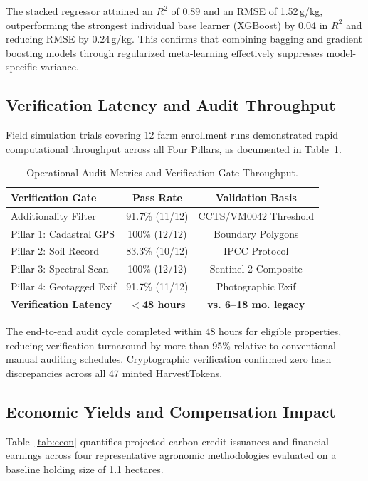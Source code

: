 \documentclass[10pt,a4paper,twocolumn]{IEEEtran}
\begin{document}
The stacked regressor attained an $R^2$ of 0.89 and an RMSE of 1.52\,g/kg, outperforming the strongest individual base learner (XGBoost) by 0.04 in $R^2$ and reducing RMSE by 0.24\,g/kg. This confirms that combining bagging and gradient boosting models through regularized meta-learning effectively suppresses model-specific variance.

\subsection{Verification Latency and Audit Throughput}
Field simulation trials covering 12 farm enrollment runs demonstrated rapid computational throughput across all Four Pillars, as documented in Table~\ref{tab:audit}.

\begin{table}[htbp]
  \centering
  \caption{Operational Audit Metrics and Verification Gate Throughput.}
  \label{tab:audit}
  \begin{tabularx}{\columnwidth}{@{}Xcc@{}}
    \toprule
    \textbf{Verification Gate} & \textbf{Pass Rate} & \textbf{Validation Basis} \\
    \midrule
    Additionality Filter   & 91.7\% (11/12) & CCTS/VM0042 Threshold \\
    Pillar 1: Cadastral GPS & 100\% (12/12)  & Boundary Polygons \\
    Pillar 2: Soil Record   & 83.3\% (10/12) & IPCC Protocol \\
    Pillar 3: Spectral Scan & 100\% (12/12)  & Sentinel-2 Composite \\
    Pillar 4: Geotagged Exif& 91.7\% (11/12) & Photographic Exif \\
    \midrule
    \textbf{Verification Latency}& \textbf{$<$48 hours} & \textbf{vs. 6--18 mo. legacy} \\
    \bottomrule
  \end{tabularx}
\end{table}

The end-to-end audit cycle completed within 48 hours for eligible properties, reducing verification turnaround by more than 95\% relative to conventional manual auditing schedules. Cryptographic verification confirmed zero hash discrepancies across all 47 minted HarvestTokens.

\subsection{Economic Yields and Compensation Impact}
Table~\ref{tab:econ} quantifies projected carbon credit issuances and financial earnings across four representative agronomic methodologies evaluated on a baseline holding size of 1.1 hectares.
\end{document}
